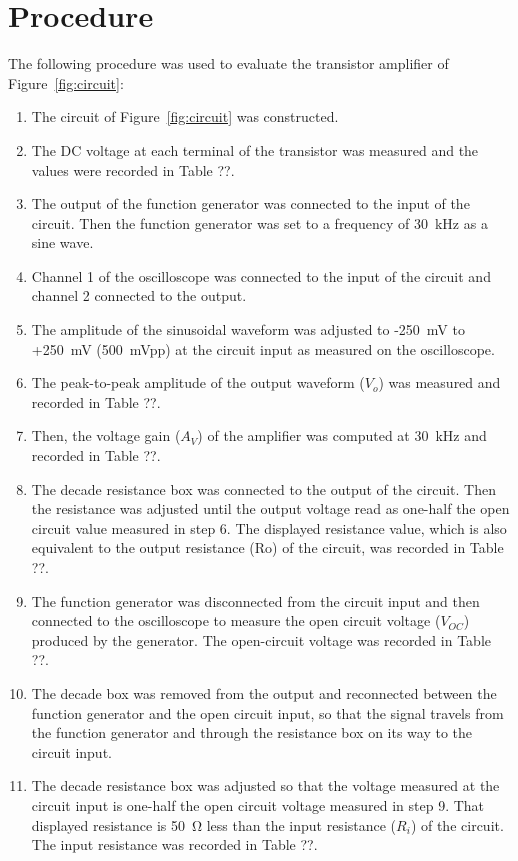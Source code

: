 \section{Procedure}
The following procedure was used to evaluate the transistor amplifier of Figure~\ref{fig:circuit}:

\begin{enumerate}
\item The circuit of Figure~\ref{fig:circuit} was constructed.
\item The DC voltage at each terminal of the transistor was measured and the values were recorded in Table ??.
\item The output of the function generator was connected to the input of the circuit. Then the function generator was set to a frequency of \SI{30}{\kilo\hertz} as a sine wave.
\item Channel 1 of the oscilloscope was connected to the input of the circuit and channel 2 connected to the output.
\item The amplitude of the sinusoidal waveform was adjusted to -\SI{250}{mV} to +\SI{250}{mV} (\SI{500}{mVpp}) at the circuit input as measured on the oscilloscope.
\item The peak-to-peak amplitude of the output waveform ($V_o$) was measured and recorded in Table ??.
\item Then, the voltage gain ($A_V$) of the amplifier was computed at \SI{30}{\kilo\hertz} and recorded in Table ??.
\item The decade resistance box was connected to the output of the circuit. Then the resistance was adjusted until the output voltage read as one-half the open circuit value measured in step 6. The displayed resistance value, which is also equivalent to the output resistance (Ro) of the circuit, was recorded in Table ??.
\item The function generator was disconnected from the circuit input and then connected to the oscilloscope to measure the open circuit voltage ($V_{OC}$) produced by the generator. The open-circuit voltage was recorded in Table ??.
\item The decade box was removed from the output and reconnected between the function generator and the open circuit input, so that the signal travels from the function generator and through the resistance box on its way to the circuit input.
\item The decade resistance box was adjusted so that the voltage measured at the circuit input is one-half the open circuit voltage measured in step 9. That displayed resistance is \SI{50}{\ohm} less than the input resistance ($R_i$) of the circuit. The input resistance was recorded in Table ??.

\end{enumerate}
